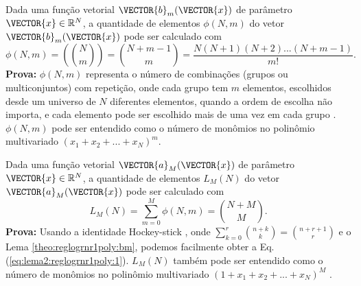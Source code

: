 \begin{lema}\label{theo:reglogrnr1poly:bm}
Dada uma função vetorial $\VECTOR{b}_m(\VECTOR{x})$ de parâmetro $\VECTOR{x}\in \mathbb{R}^{N}$,
a quantidade de elementos $\phi(N,m)$ do vetor $\VECTOR{b}_m(\VECTOR{x})$ pode ser calculado com 
\begin{equation}
\phi(N,m)=\left(\!\!{\binom{N}{m}}\!\!\right)=\binom{N+m-1}{m}=\frac{N(N+1)(N+2)...(N+m-1)}{m!}.
\end{equation}
\textbf{Prova:} $\phi(N,m)$ representa o número de combinações 
(grupos ou multiconjuntos) com repetição,
onde  cada grupo tem $m$ elementos,
escolhidos desde um universo de $N$ diferentes elementos, quando a ordem de escolha não importa, 
e cada elemento pode ser escolhido mais de uma vez em cada grupo \cite[pp. 101,107]{scheinerman2012mathematics}.
$\phi(N,m)$ pode ser entendido como o número de monômios no polinômio multivariado $\left(x_1+x_2+...+x_N\right)^m$.
\end{lema}

\begin{lema}\label{theo:reglogrnr1poly:aM}
Dada uma função vetorial $\VECTOR{a}_M(\VECTOR{x})$ de parâmetro $\VECTOR{x}\in \mathbb{R}^{N}$,
a quantidade de elementos $L_M(N)$ do vetor $\VECTOR{a}_M(\VECTOR{x})$ pode ser calculado com \cite[pp. 231]{bortolussi2019computational}
\begin{equation}\label{eq:lema2:reglogrnr1poly:1}
L_M(N)=\sum \limits_{m=0}^{M}\phi(N,m)=\binom{N+M}{M}.
\end{equation}
\textbf{Prova:} Usando a identidade Hockey-stick \cite{detemple2014combinatorial},
onde $\sum_{k=0}^{r}\binom{n+k}{k}=\binom{n+r+1}{r}$ e o Lema \ref{theo:reglogrnr1poly:bm},
podemos facilmente obter a Eq. (\ref{eq:lema2:reglogrnr1poly:1}).
$L_M(N)$ também pode ser entendido como o número de monômios no polinômio multivariado 
$\left(1+x_1+x_2+...+x_N\right)^M$ \cite[pp. 121]{zippel2012effective}.
\end{lema}
